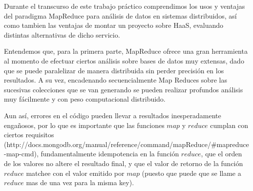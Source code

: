 Durante el transcurso de este trabajo pr\'actico comprendimos los usos y ventajas del paradigma MapReduce para an\'alisis de datos en sistemas distribuidos, 
as\'i como tambien las ventajas de montar un proyecto sobre HaaS, evaluando distintas alternativas de dicho servicio.


Entendemos que, para la primera parte, MapReduce ofrece una gran herramienta al momento de efectuar ciertos an\'alisis sobre 
bases de datos muy extensas, dado que se puede paralelizar de manera distribuida sin perder precisi\'on en los resultados. A su vez, 
encadenando secuencialmente Map Reduces sobre las sucesivas colecciones que se van generando se pueden realizar profundos an\'alisis 
muy f\'acilmente y con peso computacional distribuido.


Aun as\'i, errores en el c\'odigo pueden llevar a resultados inesperadamente engañosos, 
por lo que es importante que las funciones $map$ y $reduce$ cumplan con ciertos requisitos (http://docs.mongodb.org/manual/reference/command/mapReduce/\#mapreduce-map-cmd), 
fundamentalmente idempotencia en la funci\'on $reduce$, que el orden de los valores no altere el resultado final, y que el valor de retorno 
de la funci\'on $reduce$ matchee con el valor emitido por $map$ (puesto que puede que se llame a $reduce$ mas de una vez para la misma key).


